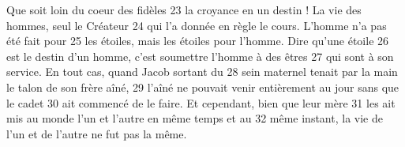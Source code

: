 Que soit loin du coeur des fidèles	 
23	 	la croyance en un destin ! La vie des hommes, seul le Créateur	 
24	 	qui l'a donnée en règle le cours. L'homme n'a pas été fait pour	 
25	 	les étoiles, mais les étoiles pour l'homme. Dire qu'une étoile	 
26	 	est le destin d'un homme, c'est soumettre l'homme à des êtres	 
27	 	qui sont à son service. En tout cas, quand Jacob sortant du	 
28	 	sein maternel tenait par la main le talon de son frère aîné,	 
29	 	l'aîné ne pouvait venir entièrement au jour sans que le cadet	 
30	 	ait commencé de le faire. Et cependant, bien que leur mère	 
31	 	les ait mis au monde l'un et l'autre en même temps et au	 
32	 	même instant, la vie de l'un et de l'autre ne fut pas la même.